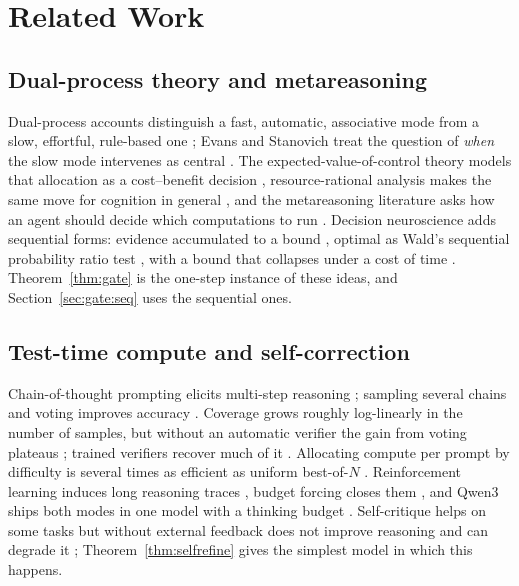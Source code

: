 \section{Related Work}
\label{sec:background}

\subsection{Dual-process theory and metareasoning}
Dual-process accounts distinguish a fast, automatic, associative mode from a
slow, effortful, rule-based one
\cite{sloman1996two,stanovich2000individual,kahneman2011thinking}; Evans and
Stanovich treat the question of \emph{when} the slow mode intervenes as central
\cite{evans2013dual}. The expected-value-of-control theory models that
allocation as a cost--benefit decision \cite{shenhav2013evc}, resource-rational
analysis makes the same move for cognition in general
\cite{lieder2020resource}, and the metareasoning literature asks how an agent
should decide which computations to run \cite{russell1991metareasoning}.
Decision neuroscience adds sequential forms: evidence accumulated to a bound
\cite{gold2007neural}, optimal as Wald's sequential probability ratio test
\cite{wald1945sequential,wald1948optimum}, with a bound that collapses under a
cost of time \cite{frazier2007deadline,drugowitsch2012cost}.
Theorem~\ref{thm:gate} is the one-step instance of these ideas, and
Section~\ref{sec:gate:seq} uses the sequential ones.

\subsection{Test-time compute and self-correction}
Chain-of-thought prompting elicits multi-step reasoning \cite{wei2022cot};
sampling several chains and voting improves accuracy
\cite{wang2023selfconsistency}. Coverage grows roughly log-linearly in the
number of samples, but without an automatic verifier the gain from voting
plateaus \cite{brown2024monkeys}; trained verifiers recover much of it
\cite{cobbe2021gsm8k,lightman2024verify}. Allocating compute per prompt by
difficulty is several times as efficient as uniform best-of-$N$
\cite{snell2024scaling}. Reinforcement learning induces long reasoning traces
\cite{deepseek2025r1,guo2025deepseekr1nature,openai2024o1}, budget forcing
closes them \cite{muennighoff2025s1}, and Qwen3 ships both modes in one model
with a thinking budget \cite{qwen2025qwen3}. Self-critique helps on some tasks
\cite{madaan2023selfrefine,shinn2023reflexion} but without external feedback
does not improve reasoning and can degrade it
\cite{huang2024selfcorrect,kamoi2024survey}; Theorem~\ref{thm:selfrefine} gives
the simplest model in which this happens.

